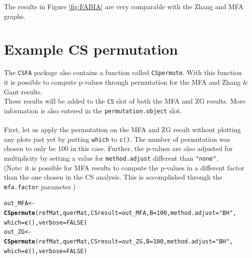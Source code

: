 \documentclass[a4paper]{article}\usepackage[]{graphicx}\usepackage[]{color}
\makeatletter
\newcommand{\hlnum}[1]{\textcolor[rgb]{0.686,0.059,0.569}{#1}}%
\newcommand{\hlstr}[1]{\textcolor[rgb]{0.192,0.494,0.8}{#1}}%
\newcommand{\hlstd}[1]{\textcolor[rgb]{0.345,0.345,0.345}{#1}}%
\newcommand{\hlkwb}[1]{\textcolor[rgb]{0.69,0.353,0.396}{#1}}%
\newcommand{\hlkwc}[1]{\textcolor[rgb]{0.333,0.667,0.333}{#1}}%
\newcommand{\hlkwd}[1]{\textcolor[rgb]{0.737,0.353,0.396}{\textbf{#1}}}%
\newenvironment{kframe}{%
 \def\at@end@of@kframe{}%
 \ifinner\ifhmode%
  \def\at@end@of@kframe{\end{minipage}}%
  \begin{minipage}{\columnwidth}%
 \fi\fi%
 \def\FrameCommand##1{\hskip\@totalleftmargin \hskip-\fboxsep
 \colorbox{shadecolor}{##1}\hskip-\fboxsep
     \hskip-\linewidth \hskip-\@totalleftmargin \hskip\columnwidth}%
 \MakeFramed {\advance\hsize-\width
   \@totalleftmargin\z@ \linewidth\hsize
   \@setminipage}}%
 {\par\unskip\endMakeFramed%
 \at@end@of@kframe}
\newenvironment{knitrout}{}{} %
\makeatother
\begin{document}
\noindent The results in Figure \ref{fig:FABIA} are very comparable with the
Zhang and MFA graphs.

\section{Example CS permutation}
The \texttt{CSFA} package also contains a function called \texttt{CSpermute}.
With this function it is possible to compute p-values through permutation for
the MFA and Zhang \& Gant results. \\
These results will be added to the \verb|CS| slot of both the MFA and ZG
results. More information is also entered in the \verb|permutation.object| slot. 
\\ \\
First, let us apply the permutation on the MFA and ZG result without plotting
any plots just yet by putting \texttt{which} to \texttt{c()}. The number of
permutation was chosen to only be 100 in this case. Further, the p-values are
also adjusted for multiplicity by setting a value for \texttt{method.adjust}
different than \texttt{"none"}.\\
(Note: it is possible for MFA results to compute the p-values in a different factor than the one chosen in the CS analysis. This is accomplished through the \texttt{mfa.factor} parameter.)


\begin{knitrout}
\color{fgcolor}\begin{kframe}
\begin{alltt}
        \hlstd{out_MFA} \hlkwb{<-} \hlkwd{CSpermute}\hlstd{(refMat,querMat,}\hlkwc{CSresult}\hlstd{=out_MFA,}\hlkwc{B}\hlstd{=}\hlnum{100}\hlstd{,}\hlkwc{method.adjust}\hlstd{=}\hlstr{"BH"}\hlstd{,}
                        \hlkwc{which}\hlstd{=}\hlkwd{c}\hlstd{(),}\hlkwc{verbose}\hlstd{=}\hlnum{FALSE}\hlstd{)}
        \hlstd{out_ZG} \hlkwb{<-} \hlkwd{CSpermute}\hlstd{(refMat,querMat,}\hlkwc{CSresult}\hlstd{=out_ZG,}\hlkwc{B}\hlstd{=}\hlnum{100}\hlstd{,}\hlkwc{method.adjust}\hlstd{=}\hlstr{"BH"}\hlstd{,}
                        \hlkwc{which}\hlstd{=}\hlkwd{c}\hlstd{(),}\hlkwc{verbose}\hlstd{=}\hlnum{FALSE}\hlstd{)}
\end{alltt}
\end{kframe}
\end{knitrout}
\end{document}
